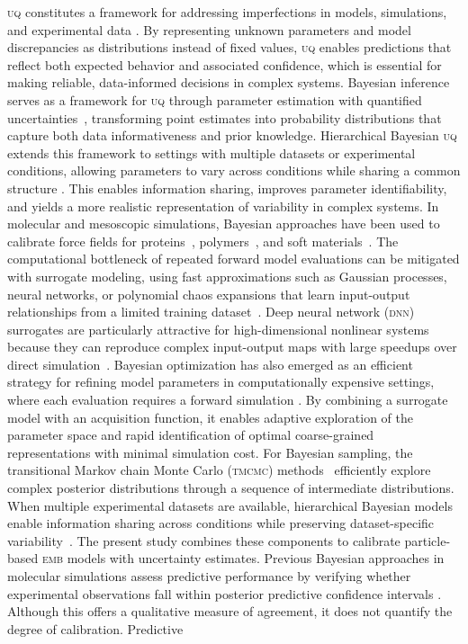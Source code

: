 \documentclass[%
 aip,
 jcp,
 amsmath,amssymb,
 preprint,%
]{revtex4-1}
\begin{document}
\textsc{uq} constitutes a framework for addressing imperfections in models, simulations, and experimental data \citep{angelikopoulos2012bayesian}. By representing unknown parameters and model discrepancies as distributions instead of fixed values, \textsc{uq} enables predictions that reflect both expected behavior and associated confidence, which is essential for making reliable, data-informed decisions in complex systems. Bayesian inference serves as a framework for \textsc{uq} through parameter estimation with quantified uncertainties~\citep{gelman2013bayesian,gregory2005bayesian,nordman2025bayesian,amoudruz2025bayesian}, transforming point estimates into probability distributions that capture both data informativeness and prior knowledge. Hierarchical Bayesian \textsc{uq} extends this framework to settings with multiple datasets or experimental conditions, allowing parameters to vary across conditions while sharing a common structure \citep{wu2016fusing}. This enables information sharing, improves parameter identifiability, and yields a more realistic representation of variability in complex systems. In molecular and mesoscopic simulations, Bayesian approaches have been used to calibrate force fields for proteins~\citep{cailliez2014calibration}, polymers~\citep{zhang2014polymer}, and soft materials~\citep{angelikopoulos2012bayesian}. The computational bottleneck of repeated forward model evaluations can be mitigated with surrogate modeling, using fast approximations such as Gaussian processes, neural networks, or polynomial chaos expansions that learn input-output relationships from a limited training dataset~\citep{rasmussen2006gaussian,wu2022multi}. Deep neural network (\textsc{dnn}) surrogates are particularly attractive for high-dimensional nonlinear systems because they can reproduce complex input-output maps with large speedups over direct simulation~\citep{raissi2019physics,lu2021deepxde}. Bayesian optimization has also emerged as an efficient strategy for refining model parameters in computationally expensive settings, where each evaluation requires a forward simulation \citep{ray2025refining}. By combining a surrogate model with an acquisition function, it enables adaptive exploration of the parameter space and rapid identification of optimal coarse-grained representations with minimal simulation cost. For Bayesian sampling, the transitional Markov chain Monte Carlo (\textsc{tmcmc}) methods~\citep{ching2007transitional,beck2002bayesian} efficiently explore complex posterior distributions through a sequence of intermediate distributions. When multiple experimental datasets are available, hierarchical Bayesian models enable information sharing across conditions while preserving dataset-specific variability~\citep{gelman2013bayesian,gelman2006multilevel,economides2021hierarchical,amoudruz2023stress}. The present study combines these components to calibrate particle-based \textsc{emb} models with uncertainty estimates. Previous Bayesian approaches in molecular simulations assess predictive performance by verifying whether experimental observations fall within posterior predictive confidence intervals \cite{economides2021hierarchical,amoudruz2023stress}. Although this offers a qualitative measure of agreement, it does not quantify the degree of calibration. Predictive 
\end{document}
